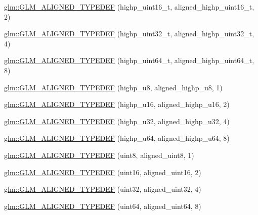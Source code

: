 \begin{DoxyCompactItemize}
\item 
\hyperlink{group__gtx__type__aligned_ga9fc4421dbb833d5461e6d4e59dcfde55}{glm\-::\-G\-L\-M\-\_\-\-A\-L\-I\-G\-N\-E\-D\-\_\-\-T\-Y\-P\-E\-D\-E\-F} (highp\-\_\-uint16\-\_\-t, aligned\-\_\-highp\-\_\-uint16\-\_\-t, 2)
\item 
\hyperlink{group__gtx__type__aligned_ga329f1e2b94b33ba5e3918197030bcf03}{glm\-::\-G\-L\-M\-\_\-\-A\-L\-I\-G\-N\-E\-D\-\_\-\-T\-Y\-P\-E\-D\-E\-F} (highp\-\_\-uint32\-\_\-t, aligned\-\_\-highp\-\_\-uint32\-\_\-t, 4)
\item 
\hyperlink{group__gtx__type__aligned_ga71e646f7e301aa422328194162c9c998}{glm\-::\-G\-L\-M\-\_\-\-A\-L\-I\-G\-N\-E\-D\-\_\-\-T\-Y\-P\-E\-D\-E\-F} (highp\-\_\-uint64\-\_\-t, aligned\-\_\-highp\-\_\-uint64\-\_\-t, 8)
\item 
\hyperlink{group__gtx__type__aligned_ga8942e09f479489441a7a5004c6d8cb66}{glm\-::\-G\-L\-M\-\_\-\-A\-L\-I\-G\-N\-E\-D\-\_\-\-T\-Y\-P\-E\-D\-E\-F} (highp\-\_\-u8, aligned\-\_\-highp\-\_\-u8, 1)
\item 
\hyperlink{group__gtx__type__aligned_gaab32497d6e4db16ee439dbedd64c5865}{glm\-::\-G\-L\-M\-\_\-\-A\-L\-I\-G\-N\-E\-D\-\_\-\-T\-Y\-P\-E\-D\-E\-F} (highp\-\_\-u16, aligned\-\_\-highp\-\_\-u16, 2)
\item 
\hyperlink{group__gtx__type__aligned_gaaadbb34952eca8e3d7fe122c3e167742}{glm\-::\-G\-L\-M\-\_\-\-A\-L\-I\-G\-N\-E\-D\-\_\-\-T\-Y\-P\-E\-D\-E\-F} (highp\-\_\-u32, aligned\-\_\-highp\-\_\-u32, 4)
\item 
\hyperlink{group__gtx__type__aligned_ga92024d27c74a3650afb55ec8e024ed25}{glm\-::\-G\-L\-M\-\_\-\-A\-L\-I\-G\-N\-E\-D\-\_\-\-T\-Y\-P\-E\-D\-E\-F} (highp\-\_\-u64, aligned\-\_\-highp\-\_\-u64, 8)
\item 
\hyperlink{group__gtx__type__aligned_gabde1d0b4072df35453db76075ab896a6}{glm\-::\-G\-L\-M\-\_\-\-A\-L\-I\-G\-N\-E\-D\-\_\-\-T\-Y\-P\-E\-D\-E\-F} (uint8, aligned\-\_\-uint8, 1)
\item 
\hyperlink{group__gtx__type__aligned_ga06c296c9e398b294c8c9dd2a7693dcbb}{glm\-::\-G\-L\-M\-\_\-\-A\-L\-I\-G\-N\-E\-D\-\_\-\-T\-Y\-P\-E\-D\-E\-F} (uint16, aligned\-\_\-uint16, 2)
\item 
\hyperlink{group__gtx__type__aligned_gacf1744488c96ebd33c9f36ad33b2010a}{glm\-::\-G\-L\-M\-\_\-\-A\-L\-I\-G\-N\-E\-D\-\_\-\-T\-Y\-P\-E\-D\-E\-F} (uint32, aligned\-\_\-uint32, 4)
\item 
\hyperlink{group__gtx__type__aligned_ga3328061a64c20ba59d5f9da24c2cd059}{glm\-::\-G\-L\-M\-\_\-\-A\-L\-I\-G\-N\-E\-D\-\_\-\-T\-Y\-P\-E\-D\-E\-F} (uint64, aligned\-\_\-uint64, 8)

\end{DoxyCompactItemize}
